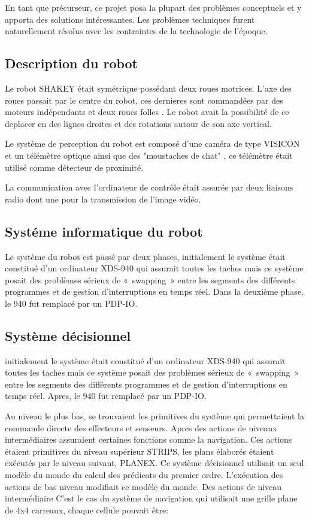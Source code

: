 En tant que précurseur, ce projet posa la plupart des problèmes conceptuels et y apporta des solutions intéressantes. Les problèmes techniques furent naturellement résolus avec les contraintes de la technologie de l'époque.

\subsection{Description du robot}
Le robot SHAKEY était symétrique possédant deux roues motrices.  L'axe des roues passait par le centre du robot, ces dernieres sont commandées par des moteurs indépendants et deux roues folles . Le robot avait la possibilité de ce deplacer en des lignes droites et des rotations autour de son axe vertical.

Le système de perception du robot est composé d'une caméra de type VISICON et un télémètre optique ainsi que des "moustaches de chat" , ce télémètre était utilisé comme détecteur de proximité.

La communication avec l'ordinateur de contrôle était assurée par deux liaisons radio dont une pour la transmission de l'image vidéo.

\newpage
\subsection{Systéme informatique du robot}
Le système du robot est passé par deux phases, initialement le système était constitué d’un ordinateur XDS-940 qui assurait toutes les taches mais ce système posait des problèmes sérieux de « swapping » entre les segments des différents programmes et de gestion d'interruptions en temps réel. Dans la deuxième phase, le 940 fut remplacé par un PDP-IO.
\subsection{Système décisionnel}
initialement le système était constitué d’un ordinateur XDS-940 qui assurait toutes les taches mais ce système posait des problèmes sérieux de « swapping » entre les segments des différents programmes et de gestion d'interruptions en temps réel. Apres, le 940 fut remplacé par un PDP-IO.

Au niveau le plus bas, se trouvaient les primitives du système qui permettaient la commande directe des effecteurs et senseurs.
Apres des actions de niveaux intermédiaires assuraient certaines fonctions comme la navigation. Ces actions étaient primitives du niveau supérieur STRIPS, les plans élaborés étaient exécutés par le niveau suivant, PLANEX.
Ce système décisionnel utilisait un seul modèle du monde  du calcul des prédicats du premier ordre. L'exécution des actions de bas niveau modifiait ce modèle du monde.
Des actions de niveau intermédiaire C'est le cas du système de navigation qui utilisait une grille plane de 4x4 carreaux, chaque cellule pouvait être:

